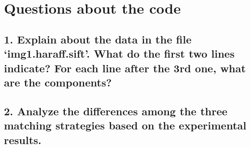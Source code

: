 \section{Questions about the code}

\subsection{1. Explain about the data in the file ‘img1.haraff.sift’. What do
the first two lines indicate?  For each line after the 3rd one, what are the
components?}

\subsection{2. Analyze the differences among the three matching strategies
based on the experimental results.}









